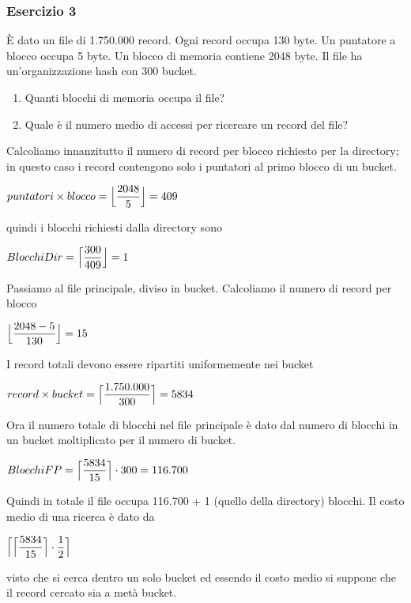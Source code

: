 \subsubsection{Esercizio 3}
\`E dato un file di 1.750.000 record. Ogni record occupa 130 byte. Un puntatore a blocco occupa 5 byte. 
Un blocco di memoria contiene 2048 byte. Il file ha un’organizzazione hash con 300 bucket.
\begin{enumerate}
 \item Quanti blocchi di memoria occupa il file?
 \item Quale è il numero medio di accessi per ricercare un record del file?
\end{enumerate}
\begin{multicols}{2}
Calcoliamo innanzitutto il numero di record per blocco richiesto per la directory; in questo
caso i record contengono solo i puntatori al primo blocco di un bucket.
\begin{center}
 $puntatori \times blocco = \Bigl\lfloor \dfrac{2048}{5} \Bigr\rfloor = 409$
\end{center}
quindi i blocchi richiesti dalla directory sono
\begin{center}
 $BlocchiDir = \Bigl\lceil \dfrac{300}{409} \Bigr\rfloor = 1$
\end{center}
Passiamo al file principale, diviso in bucket. Calcoliamo il numero di record per blocco
\begin{center}
 $\Bigl\lfloor \dfrac{2048-5}{130} \Bigr\rfloor = 15$
\end{center}
I record totali devono essere ripartiti uniformemente nei bucket
\begin{center}
 $record \times bucket = \Bigl\lceil \dfrac{1.750.000}{300} \Bigr\rceil = 5834$
\end{center}
Ora il numero totale di blocchi nel file principale è dato dal numero di blocchi in un bucket
moltiplicato per il numero di bucket.
\begin{center}
 $BlocchiFP = \Bigl\lceil \dfrac{5834}{15} \Bigr\rceil \cdot 300 = 116.700$
\end{center}
Quindi in totale il file occupa 116.700 + 1 (quello della directory) blocchi. Il costo medio di 
una ricerca è dato da
\begin{center}
 $\Bigl\lceil \Bigl\lceil \dfrac{5834}{15} \Bigr\rceil \cdot \dfrac{1}{2} \Bigr\rceil$
\end{center}
visto che si cerca dentro un solo bucket ed essendo il costo medio si suppone che il record
cercato sia a metà bucket.
\end{multicols}








